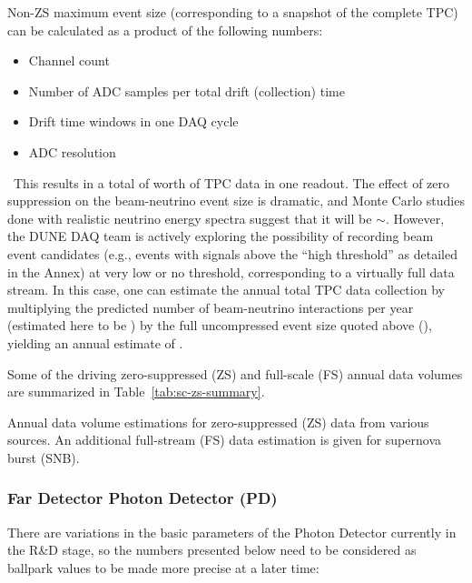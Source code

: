 Non-ZS maximum event size (corresponding to a snapshot of the complete TPC) can be calculated as a product of the following numbers:
\begin{itemize}
\item Channel count
\item Number of ADC samples per total drift (collection) time
\item Drift time windows in one DAQ cycle
\item ADC resolution
\end{itemize}
\
This results in a total of \dunefsreadoutsize worth of TPC data in one
readout.
The effect of zero suppression on
the beam-neutrino event size is dramatic, and Monte Carlo studies done with realistic neutrino
energy spectra suggest that it will be $\sim$\beameventsize.
However, %
the DUNE DAQ team is actively exploring the possibility of
recording beam event candidates (e.g., events with signals
above the ``high threshold'' as detailed in the Annex) at very low or no threshold, corresponding
to a virtually full data stream.
In this case, one can estimate the annual total %
TPC data collection
by multiplying the predicted number of beam-neutrino interactions
per year (estimated here to be \beamrate) by the full uncompressed event size quoted above (\dunefsreadoutsize), yielding
an annual estimate of \beamdatayearfs. %

Some of the driving zero-suppressed (ZS) and full-scale (FS) annual
data volumes are summarized in Table~\ref{tab:sc-zs-summary}.
\begin{table}[htbp]
  \centering
  \caption{Annual data volume estimations for zero-suppressed (ZS) data from various sources.
  An additional full-stream (FS) data estimation is given for supernova burst (SNB).}
  
  \label{tab:sc-zs-summary}
\end{table}

\subsubsection{Far Detector Photon Detector (PD)}
There are variations in the basic parameters of the Photon Detector currently in the R\&D stage,
so the numbers presented below need to be considered as ballpark values to be made more precise
at a later time:

